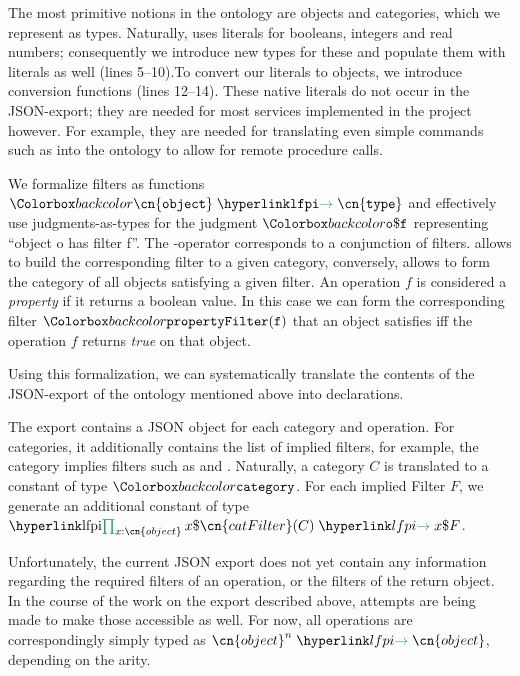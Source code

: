 The most primitive notions in the \GAP ontology are objects and categories, which we represent as \LF types. Naturally, \GAP uses literals for booleans, integers and real numbers; consequently we introduce new types for these and populate them with literals as well (lines 5--10).To convert our literals to \GAP objects, we introduce conversion functions (lines 12--14). These \GAP native literals do not occur in the JSON-export; they are needed for most services implemented in the \ODK project however. For example, they are needed for translating even simple commands such as  into the \GAP ontology to allow for remote procedure calls.

We formalize filters as functions $\expr{\lfarrow{\cn{object}}{\cn{type}}}$ and effectively use judgments-as-types for the judgment $\expr{ o \$ f}$ representing ``object \cn o has filter \cn f''. The -operator corresponds to a conjunction of filters.
 allows to build the corresponding filter to a given category, conversely,  allows to form the category of all objects satisfying a given filter.
An operation $f$ is considered a \emph{property} if it returns a boolean value. In this case we can form the corresponding filter $\expr{propertyFilter(f)}$ that an object satisfies iff the operation $f$ returns \emph{true} on that object.\medskip

Using this formalization, we can systematically translate the contents of the JSON-export of the \GAP ontology mentioned above into \ommt declarations.

The export contains a JSON object for each category and operation. For categories, it additionally contains the list of implied filters, for example, the category  implies filters such as  and . Naturally, a category $C$ is translated to a constant of type $\expr{category}$. For each implied Filter $F$, we generate an additional constant of type $\lfpi{x:\cn{object}}{\lfarrow{x\$\cn{catFilter}(C)}{x\$ F}}$.

Unfortunately, the current JSON export does not yet contain any information regarding the required filters of an operation, or the filters of the return object. In the course of the work on the export described above, attempts are being made to make those accessible as well. For now, all operations are correspondingly simply typed as $\lfarrow{\cn{object}^n}{\cn{object}}$, depending on the arity. \medskip

